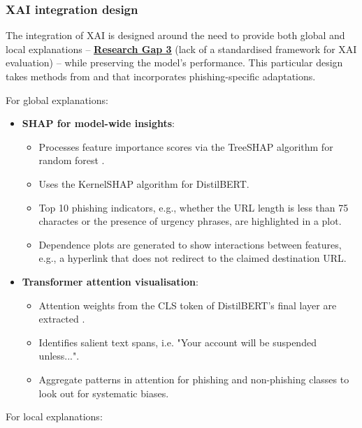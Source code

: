 
\subsubsection*{XAI integration design}
The integration of XAI is designed around the need to provide both global and local explanations -- \hyperref[research-gap-3]{\uline{\textbf{Research Gap 3}}} (lack of a standardised framework for XAI evaluation) -- while preserving the model's performance. This particular design takes methods from \cite{ribeiro2016model} and \cite{shendkar2024enhancing} that incorporates phishing-specific adaptations.\newline

\noindent For global explanations:

\begin{itemize}
  \item \textbf{SHAP for model-wide insights}:
  \begin{itemize}
    \item Processes feature importance scores via the TreeSHAP algorithm for random forest \citep{lundberg2017unified}.
    \item Uses the KernelSHAP algorithm for DistilBERT.
    \item Top 10 phishing indicators, e.g., whether the URL length is less than 75 charactes or the presence of urgency phrases, are highlighted in a plot. 
    \item Dependence plots are generated to show interactions between features, e.g., a hyperlink that does not redirect to the claimed destination URL.
  \end{itemize}
  \item \textbf{Transformer attention visualisation}:
  \begin{itemize}
    \item Attention weights from the CLS token of DistilBERT's final layer are extracted \citep{vo2024securing}.
    \item Identifies salient text spans, i.e. "Your account will be suspended unless...".
    \item Aggregate patterns in attention for phishing and non-phishing classes to look out for systematic biases.
  \end{itemize}
\end{itemize}

\noindent For local explanations:

